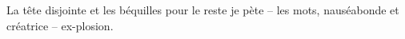 



    	





  La tête  disjointe et  les béquilles pour  le reste je  pète --  les mots,
  nauséabonde et créatrice -- ex-plosion. 

